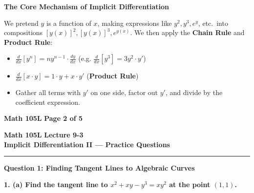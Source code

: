 \documentclass[10.5pt]{article}
\begin{document}
\vspace{0.03in}

\textbf{\large The Core Mechanism of Implicit Differentiation}
\begin{tcolorbox}[colback=blue!3!white, colframe=chalkblue, boxrule=0.8pt, arc=3pt, left=8pt, right=8pt, top=4pt, bottom=4pt]
We pretend $y$ is a function of $x$, making expressions like $y^2, y^3, e^y$, etc.\ into compositions $[y(x)]^2, [y(x)]^3, e^{y(x)}$.
We then apply the \textbf{Chain Rule} and \textbf{Product Rule}:
\begin{itemize}[leftmargin=1.2em, topsep=1pt, itemsep=1pt]
  \item $\frac{d}{dx}[y^n] = n y^{n-1} \cdot \frac{dy}{dx}$ \quad (e.g. $\frac{d}{dx}[y^3] = 3y^2 \cdot y'$)
  \item $\frac{d}{dx}[x \cdot y] = 1 \cdot y + x \cdot y'$ \quad (\textbf{Product Rule})
  \item Gather all terms with $y'$ on one side, factor out $y'$, and divide by the coefficient expression.
\end{itemize}
\end{tcolorbox}

\vfill
\noindent \textbf{\small Math 105L} \hfill \textbf{\small Page 2 of 5}

\newpage

\noindent \textbf{\large Math 105L} \hfill \textbf{\large Lecture 9-3}\\[1pt]
{\textbf{\Large Implicit Differentiation II --- Practice Questions}}\\[-5pt]
\rule{\textwidth}{1.2pt}

\vspace{0.05in}

\textbf{\large Question 1: Finding Tangent Lines to Algebraic Curves}

\textbf{1. (a) Find the tangent line to $x^2 + xy - y^3 = xy^2$ at the point $(1,1)$.}

\vspace{0.02in}
\end{document}
